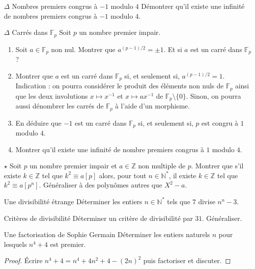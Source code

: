 \documentclass[french,a4paper]{article}
\newcommand{\N}{\mathbb{N}}
\newcommand{\Z}{\mathbb{Z}}
\newcommand{\st}{^*}
\newcommand{\inv}{^{-1}}
\newcommand{\F}{\mathbb{F}}
\theoremstyle{plain}
\theoremstyle{definition}
\theoremstyle{remark}
\begin{document}
\begin{ex}[Moulin.AG.48]{$\Delta$ Nombres premiers congrus à $-1$ modulo $4$}
	Démontrer qu'il existe une infinité de nombres premiers congrus à $-1$ modulo $4$.
\end{ex}

\begin{ex}[Moulin.AG.49]{$\Delta$ Carrés dans $\F_p$}
	Soit $p$ un nombre premier impair.
	\begin{enumerate}
		\item Soit $a\in\F_p$ non nul. Montrer que $a^{(p-1)/2}=\pm 1$. Et si $a$ est un carré dans $\F_p$ ?
		\item Montrer que $a$ est un carré dans $\F_p$ si, et seulement si, $a^{(p-1)/2}=1$. Indication : on pourra considérer le produit des éléments non nuls de $\F_p$ ainsi que les deux involutions $x\mapsto x\inv$ et $x\mapsto ax\inv$ de $\F_p\setminus\{0\}$. Sinon, on pourra aussi dénombrer les carrés de $\F_p$ à l'aide d'un morphisme.
		\item En déduire que $-1$ est un carré dans $\F_p$ si, et seulement si, $p$ est congru à $1$ modulo $4$.
		\item Montrer qu'il existe une infinité de nombre premiers congrus à $1$ modulo $4$.
	\end{enumerate}
\end{ex}

\begin{ex}[Moulin.AG.50]{$\star$}
	Soit $p$ un nombre premier impair et $a\in\Z$ non multiple de $p$. Montrer que s'il existe $k\in\Z$ tel que $k^2\equiv a[p]$ alors, pour tout $n\in\N\st$, il existe $k\in\Z$ tel que $k^2\equiv a[p^n]$. Généraliser à des polynômes autres que $X^2-a$.
\end{ex}

\begin{ex}[Moulin.AG.51]{Une divisibilité étrange}
	Déterminer les entiers $n\in\N\st$ tels que $7$ divise $n^n-3$.
\end{ex}

\begin{ex}[Sageaux]{Critères de divisibilité}
	Déterminer un critère de divisibilité par $31$. Généraliser.
\end{ex}

\begin{ex}[Moulin.AG.52]{Une factorisation de Sophie Germain}
	Déterminer les entiers naturels $n$ pour lesquels $n^4+4$ est premier.
\end{ex}
\begin{proof}
	Écrire $n^4+4=n^4+4n^2+4-(2n)^2$ puis factoriser et discuter.
\end{proof}
\end{document}
